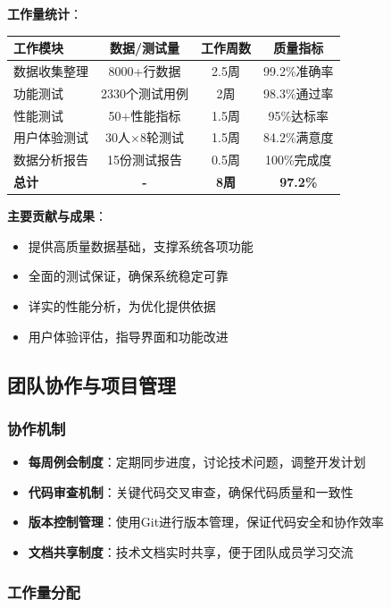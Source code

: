 \documentclass[12pt,a4paper]{article}
\begin{document}
\textbf{工作量统计}：
\begin{center}
\begin{tabular}{|l|c|c|c|}
\hline
\textbf{工作模块} & \textbf{数据/测试量} & \textbf{工作周数} & \textbf{质量指标} \\
\hline
数据收集整理 & 8000+行数据 & 2.5周 & 99.2\%准确率 \\
功能测试 & 2330个测试用例 & 2周 & 98.3\%通过率 \\
性能测试 & 50+性能指标 & 1.5周 & 95\%达标率 \\
用户体验测试 & 30人×8轮测试 & 1.5周 & 84.2\%满意度 \\
数据分析报告 & 15份测试报告 & 0.5周 & 100\%完成度 \\
\hline
\textbf{总计} & \textbf{-} & \textbf{8周} & \textbf{97.2\%} \\
\hline
\end{tabular}
\end{center}

\textbf{主要贡献与成果}：
\begin{itemize}
    \item 提供高质量数据基础，支撑系统各项功能
    \item 全面的测试保证，确保系统稳定可靠
    \item 详实的性能分析，为优化提供依据
    \item 用户体验评估，指导界面和功能改进
\end{itemize}

\subsection{团队协作与项目管理}
\subsubsection{协作机制}
\begin{itemize}
    \item \textbf{每周例会制度}：定期同步进度，讨论技术问题，调整开发计划
    \item \textbf{代码审查机制}：关键代码交叉审查，确保代码质量和一致性
    \item \textbf{版本控制管理}：使用Git进行版本管理，保证代码安全和协作效率
    \item \textbf{文档共享制度}：技术文档实时共享，便于团队成员学习交流
\end{itemize}

\subsubsection{工作量分配}
\end{document}
